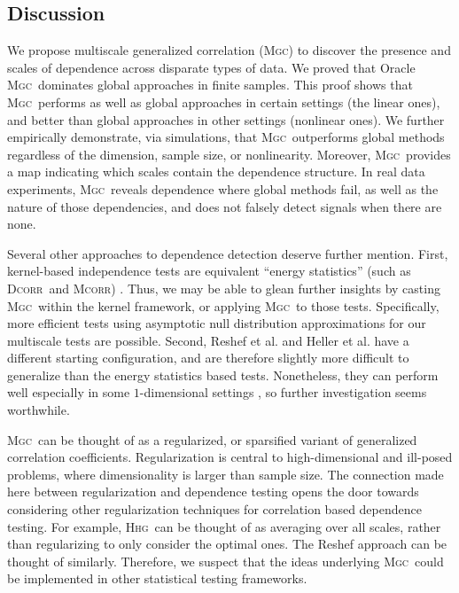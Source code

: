 \documentclass[11pt]{article}
\providecommand{\sct}[1]{{\normalfont\textsc{#1}}}
\newcommand{\Mgc}{\sct{Mgc}}
\newcommand{\Hhg}{\sct{Hhg}}
\newcommand{\Dcorr}{\sct{Dcorr}}
\newcommand{\Mcorr}{\sct{Mcorr}}
\begin{document}
\subsection*{Discussion}
\label{conclu}

We propose multiscale generalized correlation (\Mgc) to discover the presence and scales of dependence across disparate types of data.
We proved that Oracle \Mgc~dominates global approaches in finite samples.  This proof shows that \Mgc~performs as well as global approaches in certain settings (the linear ones), and better than global approaches in other settings (nonlinear ones). 
We further empirically demonstrate, via simulations, that \Mgc~outperforms global methods regardless of the dimension, sample size, or nonlinearity.  Moreover, \Mgc~provides a map indicating which scales contain the dependence structure. 
In real data experiments, \Mgc~reveals dependence where global methods fail, as well as the nature of those dependencies, and does not falsely detect signals when there are none.

Several other approaches to dependence detection deserve further mention. First, kernel-based independence tests  \cite{GrettonEtAl2005, GrettonGyorfi2010, GrettonEtAl2012} are equivalent ``energy statistics'' (such as \Dcorr~and \Mcorr) \cite{SejdinovicEtAl2013, RamdasEtAl2015}. Thus, we may be able to glean further insights by casting \Mgc~within the kernel framework, or applying \Mgc~to those tests. Specifically, more efficient tests using asymptotic null distribution approximations for our multiscale tests are possible.
Second, Reshef et al. \cite{Reshef2011} and Heller et al. \cite{heller2016consistent} have a different starting configuration, and are therefore slightly more difficult to generalize than the energy statistics based tests.  Nonetheless, they can perform well especially in some $1$-dimensional settings \cite{SimonTibshirani2012, reshef2015empirical}, so further investigation seems worthwhile. 


 \Mgc~can be thought of as a regularized, or sparsified variant of generalized correlation coefficients.  Regularization is central to high-dimensional and ill-posed problems, where dimensionality is larger than sample size. The connection made here between regularization and dependence testing opens the door towards considering other regularization techniques for correlation based dependence testing. For example, \Hhg~can be thought of as averaging over all scales, rather than regularizing to only consider the optimal ones. The Reshef approach can be thought of similarly.  Therefore, we suspect that the ideas underlying \Mgc~could be implemented in other statistical testing frameworks.
\end{document}
